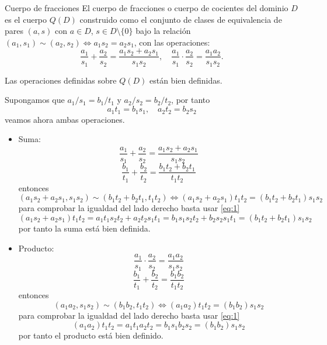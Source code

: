 \begin{definition}{Cuerpo de fracciones}{}
El cuerpo de fracciones o cuerpo de cocientes del dominio \(D\) es el cuerpo \(Q(D)\) construido como el conjunto de clases de equivalencia de pares \((a, s)\) con \(a \in D\), \(s \in D \setminus \{0\}\) bajo la relación \((a_1, s_1) \sim (a_2, s_2) \Leftrightarrow a_1 s_2 = a_2 s_1\), con las operaciones:
\[
\frac{a_1}{s_1} + \frac{a_2}{s_2} = \frac{a_1 s_2 + a_2 s_1}{s_1 s_2}, \quad \frac{a_1}{s_1} \cdot \frac{a_2}{s_2} = \frac{a_1 a_2}{s_1 s_2}.
\]
\end{definition}

\begin{proposition}{}{}
Las operaciones definidas sobre \(Q(D)\) están bien definidas.
\end{proposition}

\begin{proofbox}
Supongamos que \(a_1/s_1 = b_1/t_1\) y \(a_2/s_2 = b_2/t_2\), por tanto
\begin{equation}\label{eq:1}\tag{\star}
a_1 t_1 = b_1 s_1,\quad a_2 t_2 = b_2 s_2
\end{equation}
veamos ahora ambas operaciones.
\begin{itemize}
\item Suma:
\[
\frac{a_1}{s_1} + \frac{a_2}{s_2} = \frac{a_1 s_2 + a_2 s_1}{s_1 s_2}
\]
\[
\frac{b_1}{t_1} + \frac{b_2}{t_2} = \frac{b_1 t_2 + b_2 t_1}{t_1 t_2} 
\]
entonces
\[
(a_1 s_2 + a_2 s_1, s_1 s_2) \sim (b_1 t_2 + b_2 t_1, t_1 t_2) \iff (a_1 s_2 + a_2 s_1)t_1 t_ 2 = (b_1 t_2 + b_2 t_1) s_1 s_2
\]
para comprobar la igualdad del lado derecho basta usar \eqref{eq:1}
\[
(a_1 s_2 + a_2 s_1)t_1 t_ 2 = a_1 t_1 s_2 t_2 + a_2 t_2 s_1 t_1 = b_1 s_1 s_2 t_2 + b_2 s_2 s_1 t_1 = (b_1 t_2 + b_2 t_1) s_1 s_2
\]
por tanto la suma está bien definida.

\item Producto:
\[
\frac{a_1}{s_1} \cdot \frac{a_2}{s_2} = \frac{a_1 a_2}{s_1 s_2}
\]
\[
\frac{b_1}{t_1} + \frac{b_2}{t_2} = \frac{b_1 b_2}{t_1 t_2} 
\]
entonces
\[
(a_1 a_2, s_1 s_2) \sim (b_1 b_2, t_1 t_2) \iff (a_1 a_2)t_1 t_ 2 = (b_1 b_2) s_1 s_2
\]
para comprobar la igualdad del lado derecho basta usar \eqref{eq:1}
\[
(a_1 a_2)t_1 t_ 2 = a_1 t_1 a_2 t_2 = b_1 s_1 b_2 s_2 = (b_1 b_2) s_1 s_2
\]
por tanto el producto está bien definido.
\end{itemize}

\end{proofbox}

